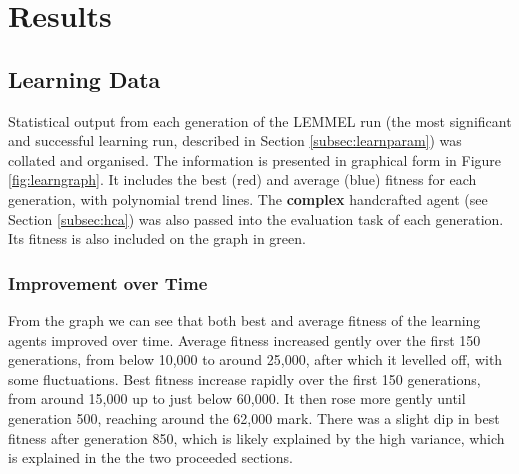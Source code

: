 
\section{Results}


\subsection{Learning Data}


Statistical output from each generation of the LEMMEL run (the most significant and successful learning run, described in Section \ref{subsec:learnparam}) was collated and organised. The information is presented in graphical form in Figure \ref{fig:learngraph}. It includes the best (red) and average (blue) fitness for each generation, with polynomial trend lines. The \textbf{complex} handcrafted agent (see Section \ref{subsec:hca}) was also passed into the evaluation task of each generation. Its fitness is also included on the graph in green.

\subsubsection{Improvement over Time}

From the graph we can see that both best and average fitness of the learning agents improved over time. Average fitness increased gently over the first 150 generations, from below 10,000 to around 25,000, after which it levelled off, with some fluctuations. Best fitness increase rapidly over the first 150 generations, from around 15,000 up to just below 60,000. It then rose more gently until generation 500, reaching around the 62,000 mark. There was a slight dip in best fitness after generation 850, which is likely explained by the high variance, which is explained in the the two proceeded sections.

